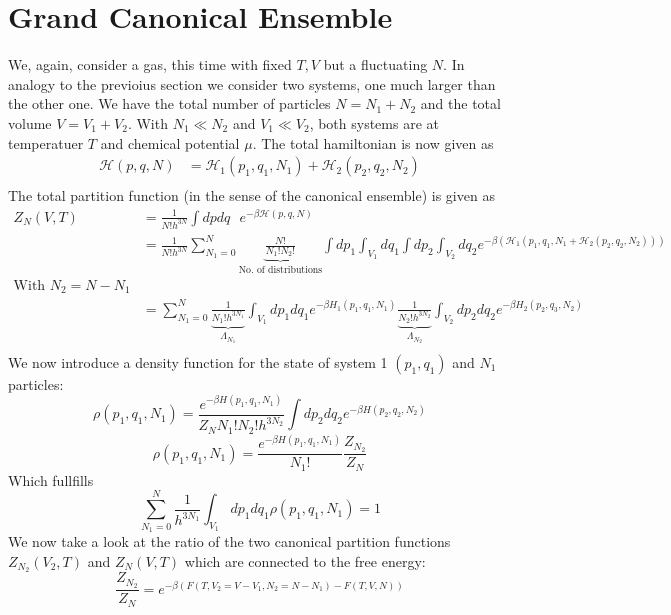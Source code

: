 \documentclass{report}
\begin{document}
\section{Grand Canonical Ensemble}
We, again, consider a gas, this time with fixed $T,V$ but a fluctuating $N$. In analogy to the previoius section we consider two systems, one much larger than the other one. We have the total number of particles $N = N_1 + N_2$ and the total volume $V = V_1+ V_2$. With $N_1 \ll N_2$ and $V_1 \ll V_2$, both systems are at temperatuer $T$ and chemical potential $\mu$. The total hamiltonian is now given as
\begin{align*}
  \mathcal{H}\left( p,q,N \right) &= \mathcal{H}_1\left( p_1,q_1,N_1 \right) + \mathcal{H}_2\left( p_2,q_2,N_2 \right)  \\
\end{align*}
The total partition function (in the sense of the canonical ensemble) is given as
\begin{align*}
  Z_N\left( V,T \right) &= \frac{1}{N! h^{3N}} \int dp dq \text{ } e^{-\beta \mathcal{H}\left( p,q,N \right) } \\
                        &= \frac{1}{N! h^{3N}} \sum_{N_1 = 0}^{N} \underbrace{\frac{N!}{N_1! N_2!}}_{\text{No. of distributions}}  \int dp_1 \int_{V_1} dq_1 \int dp_2 \int_{V_2} dq_2 e^{-\beta \left( \mathcal{H}_1\left( p_1,q_1,N_1 + \mathcal{H}_2\left( p_2,q_2,N_2 \right)  \right)  \right) } \\
                        \text{With $N_2 = N - N_1$}  \\
                        &= \sum_{N_1=0}^{N}  \underbrace{\frac{1}{N_1! h^{3N_1}}}_{\Lambda_{N_1}} \int_{V_1} dp_1 dq_1 e^{-\beta H_1\left( p_1,q_1,N_1 \right) } \underbrace{\frac{1}{N_2! h^{3N_2}}}_{\Lambda_{N_2}} \int_{V_2} dp_2 dq_2 e^{-\beta H_2\left( p_2,q_3,N_2 \right) } \\
\end{align*}
We now introduce a density function for the state of system 1 $\left( p_1, q_1 \right) $ and $N_1$ particles: \[
  \rho\left( p_1,q_1,N_1 \right) = \frac{e^{-\beta H\left( p_1,q_1,N_1 \right) }}{Z_{N} N_1! N_2! h^{3N_2}} \int dp_2 dq_2 e^{-\beta H\left( p_2,q_2,N_2 \right) }
\] \[
\rho\left( p_1,q_1,N_1 \right) = \frac{e^{-\beta H\left( p_1,q_1,N_1 \right) }}{N_1!} \frac{Z_{N_2}}{Z_N}
\] 
Which fullfills \[
  \sum_{N_1 = 0}^{N}  \frac{1}{h^{3N_1}} \int_{V_1} dp_1 dq_1 \rho\left( p_1,q_1,N_1 \right) = 1
\] 
We now take a look at the ratio of the two canonical partition functions $Z_{N_2}\left( V_2,T \right) $ and $Z_N\left( V,T \right) $ which are connected to the free energy: \[
  \frac{Z_{N_2}}{Z_N} = e^{-\beta \left( F\left( T, V_2=V-V_1, N_2=N-N_1 \right) - F\left( T,V,N \right) \right) }
\] 
\end{document}

